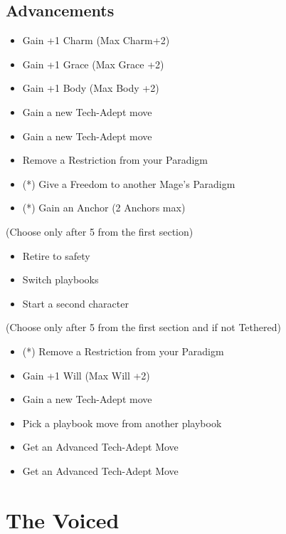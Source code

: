 \documentclass[
]{memoir}
\begin{document}
\hypertarget{advancements-6}{%
\subsection{Advancements}\label{advancements-6}}

\begin{itemize}
\tightlist
\item
  Gain +1 Charm (Max Charm+2)
\item
  Gain +1 Grace (Max Grace +2)
\item
  Gain +1 Body (Max Body +2)
\item
  Gain a new Tech-Adept move
\item
  Gain a new Tech-Adept move
\item
  Remove a Restriction from your Paradigm
\item
  (*) Give a Freedom to another Mage's Paradigm
\item
  (*) Gain an Anchor (2 Anchors max)
\end{itemize}

(Choose only after 5 from the first section)

\begin{itemize}
\tightlist
\item
  Retire to safety
\item
  Switch playbooks
\item
  Start a second character
\end{itemize}

(Choose only after 5 from the first section and if not Tethered)

\begin{itemize}
\tightlist
\item
  (*) Remove a Restriction from your Paradigm
\item
  Gain +1 Will (Max Will +2)
\item
  Gain a new Tech-Adept move
\item
  Pick a playbook move from another playbook
\item
  Get an Advanced Tech-Adept Move
\item
  Get an Advanced Tech-Adept Move
\end{itemize}

\newpage

\hypertarget{the-voiced}{%
\section{The Voiced}\label{the-voiced}}
\end{document}
